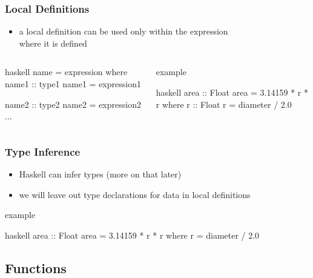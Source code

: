 \documentclass[dvipsnames]{beamer}
\theoremstyle{plain}
\begin{document}
\begin{frame}[fragile]
  \frametitle{Local Definitions}

  \medskip
  \begin{itemize}
    \item a \alert{local definition} can be used only within the expression\\
      where it is defined
  \end{itemize}

  \begin{columns}[b]
    \begin{block}{}
      \begin{pygments}{haskell}
name = expression
  where
    name1 :: type1
    name1 = expression1

    name2 :: type2
    name2 = expression2
    ...
      \end{pygments}
    \end{block}

    \pause
    \begin{exampleblock}{example}
      \begin{pygments}{haskell}
area :: Float
area = 3.14159 * r * r
  where
    r :: Float
    r = diameter / 2.0
      \end{pygments}
    \end{exampleblock}
  \end{columns}
\end{frame}

\begin{frame}[fragile]
  \frametitle{Type Inference}

  \medskip
  \begin{itemize}
    \item Haskell can infer types (more on that later)
    \item we will leave out type declarations for data in local definitions
  \end{itemize}

  \begin{exampleblock}{example}
    \begin{pygments}{haskell}
area :: Float
area = 3.14159 * r * r
  where r = diameter / 2.0
    \end{pygments}
  \end{exampleblock}
\end{frame}

\subsection{Functions}
\end{document}
